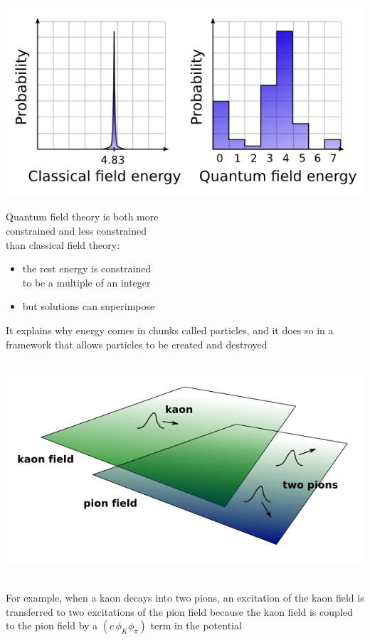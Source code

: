 \documentclass[compress]{beamer}
\begin{document}
\begin{frame}
\hfill \includegraphics[width=0.5\linewidth]{quantum_field_energy.png}

\vspace{-2.8 cm}
Quantum field theory is both more \\ constrained and less constrained \\ than classical field theory:
\begin{itemize}
\item the rest energy is constrained \\ to be a multiple of an integer
\item but solutions can superimpose
\end{itemize}

It explains why energy comes in chunks called particles, and it does so in a framework that allows particles to be created and destroyed

\vspace{0.3 cm}
\mbox{ } \hfill \includegraphics[width=0.55\linewidth]{ktopipi_fields.png} \hfill \mbox{ }

\vspace{-0.3 cm}
For example, when a kaon decays into two pions, an excitation of the kaon field is transferred to two excitations of the pion field because the kaon field is coupled to the pion field by a $(c \, \phi_K \phi_\pi)$ term in the potential
\end{frame}
\end{document}
